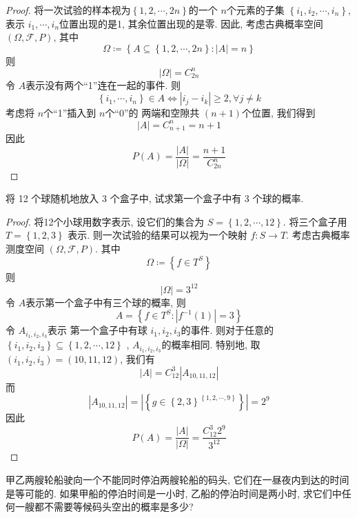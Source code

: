 \documentclass[../main.tex]{subfiles}
\begin{document}
\begin{proof}
    将一次试验的样本视为\(  \left\{ 1,2,\cdots ,2n \right\}  \)的一个 \(  n  \)个元素的子集 \(  \left\{ i_1,i_2,\cdots ,i_{n} \right\}  \), 表示 \(  i_1,\cdots ,i_{n}  \)位置出现的是1, 其余位置出现的是零. 因此, 考虑古典概率空间 \(  \left(  \Omega ,\mathcal{F},P \right)   \), 其中 \[
     \Omega \coloneqq \left\{A\subseteq \left\{ 1,2,\cdots ,2n \right\}:  \left| A \right|= n  \right\}
    \]     则 \[
    \left|  \Omega  \right|= C_{2n}^{n}  
    \]令 \(  A  \)表示没有两个``1''连在一起的事件. 则 \[
    \left\{ i_1,\cdots ,i_{n} \right\}\in A\iff  \left| i_{j}-i_{k} \right|\ge 2,\forall j\neq k 
    \] 
    考虑将 \(  n  \)个``1''插入到 \(  n  \)个``0''的 两端和空隙共 \(  \left( n+ 1 \right)   \)个位置, 我们得到 \[
    \left| A \right|= C_{n+ 1}^{n}= n+ 1 
    \]因此 \[
    P\left( A \right)= \frac{\left| A \right|  }{\left|  \Omega  \right|  }= \frac{n+ 1 }{C_{2n}^{n} }   
    \]   
\end{proof}


\begin{exercise}{}{}
将 12 个球随机地放入 3 个盒子中, 试求第一个盒子中有 3 个球的概率.
\end{exercise}
\begin{proof}
    将12个小球用数字表示, 设它们的集合为 \(  S= \left\{ 1,2,\cdots ,12 \right\}  \). 将三个盒子用 \(  T= \left\{ 1,2,3 \right\}  \)  表示. 则一次试验的结果可以视为一个映射 \(  f: S\to T  \). 考虑古典概率测度空间 \(  \left(  \Omega , \mathcal{F},P \right)   \). 其中 \[
     \Omega \coloneqq\left\{ f \in T^{S} \right\}
    \]  则 \[
    \left|  \Omega  \right|= 3^{12} 
    \]令 \(  A  \)表示第一个盒子中有三个球的概率, 则 \[
    A= \left\{ f \in T^{S}:  \left| f^{-1} \left( 1 \right)  \right|= 3  \right\}
    \] 令 \(  A_{i_1,i_2,i_3}  \)表示 第一个盒子中有球 \(  i_1,i_2,i_3  \)的事件.  则对于任意的 \(  \left\{ i_1,i_2,i_3 \right\}  \subseteq \left\{ 1,2,\cdots ,12 \right\}\)  , \(  A_{i_1,i_2,i_3}  \)的概率相同. 特别地, 取 \(  \left( i_1,i_2,i_3 \right)= \left( 10, 11 , 12 \right)    \), 我们有 \[
    \left| A \right|= C_{12}^{3}  \left| A_{10, 11 , 12} \right| 
    \]  而 \[
    \left| A_{10, 11 , 12} \right|= \left| \left\{ g\in \left\{ 2,3 \right\}^{\left\{1,2,\cdots ,9 \right\}} \right\} \right|  = 2^{9}
    \]因此 \[
    P\left( A \right)= \frac{\left| A \right|  }{\left|  \Omega  \right|  }=  \frac{C_{12}^{3}2^{9} }{3^{12} }   
    \]
\end{proof}


\begin{exercise}{}{}
甲乙两艘轮船驶向一个不能同时停泊两艘轮船的码头, 它们在一昼夜内到达的时间是等可能的. 如果甲船的停泊时间是一小时, 乙船的停泊时间是两小时, 求它们中任何一艘都不需要等候码头空出的概率是多少?
\end{exercise}
\end{document}

